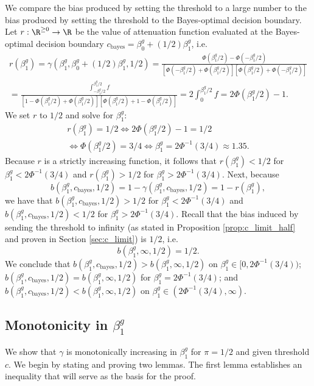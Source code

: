 \documentclass[12pt]{article}
\begin{document}
\begin{appendices}
We compare the bias produced by setting the threshold to a large number to the bias produced by setting the threshold to the Bayes-optimal decision boundary. Let $r: \R^{\geq 0} \to \R$ be the value of attenuation function evaluated at the Bayes-optimal decision boundary $c_\textrm{bayes} = \beta^g_0 + (1/2) \beta^g_1$, i.e.
\begin{multline*}
r(\beta^g_1) = \gamma(\beta^g_1, \beta^g_0 + (1/2)\beta^g_1, 1/2) = \frac{\Phi(\beta^g_1/2) - \Phi(-\beta^g_1/2)}{\left[\Phi(-\beta^g_1/2) + \Phi( \beta^g_1/2) \right] \left[\Phi(\beta^g_1/2) + \Phi( -\beta^g_1/2)\right]} \\ = \frac{\int_{-\beta^g_1/2}^{\beta^g_1/2} f}{\left[ 1 - \Phi(\beta^g_1/2) + \Phi(\beta^g_1/2) \right]\left[ \Phi(\beta^g_1/2) + 1 - \Phi(\beta^g_1/2) \right]} = 2 \int_{0}^{\beta^g_1/2} f = 2 \Phi(\beta^g_1/2) - 1.
\end{multline*}
We set $r$ to $1/2$ and solve for $\beta^g_1$:
\begin{multline*}
r(\beta^g_1) = 1/2 \iff 2\Phi(\beta^g_1/2) -1 = 1/2 \\ \iff \Phi(\beta^g_1/2) = 3/4 \iff \beta^g_1 = 2 \Phi^{-1}(3/4) \approx 1.35.
\end{multline*}
Because $r$ is a strictly increasing function, it follows that $r(\beta^g_1) < 1/2$ for $\beta^g_1 < 2\Phi^{-1}(3/4)$ and $r(\beta^g_1) > 1/2$ for $\beta^g_1 > 2\Phi^{-1}(3/4).$ Next, because $$b(\beta^g_1, c_\textrm{bayes}, 1/2) = 1 - \gamma(\beta^g_1, c_\textrm{bayes}, 1/2) = 1 - r(\beta^g_1),$$ we have that $b(\beta^g_1, c_\textrm{bayes}, 1/2) > 1/2$ for $\beta^g_1 < 2 \Phi^{-1}(3/4)$ and $b(\beta^g_1, c_\textrm{bayes}, 1/2) < 1/2$ for $\beta^g_1 > 2 \Phi^{-1}(3/4)$. Recall that the bias induced by sending the threshold to infinity (as stated in Proposition \ref{prop:c_limit_half} and proven in Section \ref{sec:c_limit}) is $1/2$, i.e. $$b(\beta^g_1, \infty, 1/2) = 1/2.$$ We conclude that $b(\beta^g_1, c_\textrm{bayes},1/2) > b(\beta^g_1, \infty, 1/2)$ on $\beta^g_1 \in [0, 2\Phi^{-1}(3/4))$; $b(\beta^g_1, c_\textrm{bayes},1/2) = b(\beta^g_1, \infty, 1/2)$ for $\beta^g_1 = 2\Phi^{-1}(3/4)$; and $b(\beta^g_1, c_\textrm{bayes},1/2) < b(\beta^g_1, \infty, 1/2)$ on $\beta^g_1 \in (2\Phi^{-1}(3/4), \infty)$.

\subsection{Monotonicity in $\beta^g_1$}\label{sec:monotone}
We show that $\gamma$ is monotonically increasing in $\beta^g_1$ for $\pi = 1/2$ and given threshold $c$. We begin by stating and proving two lemmas. The first lemma establishes an inequality that will serve as the basis for the proof.


\end{appendices}
\end{document}
